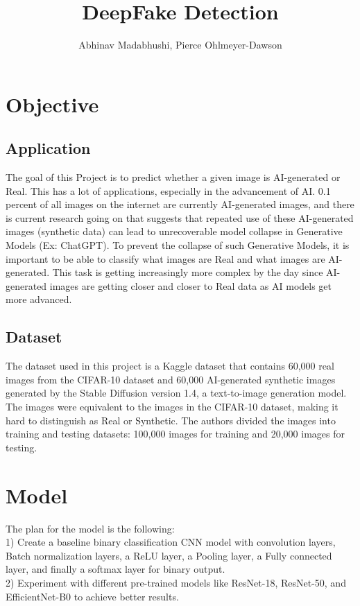 \documentclass[11pt]{article}
\title{DeepFake Detection}
\author{Abhinav Madabhushi, Pierce Ohlmeyer-Dawson}
\date{}
\begin{document}
\maketitle

\section{Objective}

\subsection{Application}
The goal of this Project is to predict whether a given image is AI-generated or Real. This has a lot of applications, especially in the advancement of AI. 0.1 percent of all images on the internet are currently AI-generated images, and there is current research going on that suggests that repeated use of these AI-generated images (synthetic data) can lead to unrecoverable model collapse in Generative Models (Ex: ChatGPT). To prevent the collapse of such Generative Models, it is important to be able to classify what images are Real and what images are AI-generated. This task is getting increasingly more complex by the day since AI-generated images are getting closer and closer to Real data as AI models get more advanced.  

\subsection{Dataset}
The dataset used in this project is a Kaggle dataset that contains 60,000 real images from the CIFAR-10 dataset and 60,000 AI-generated synthetic images generated by the Stable Diffusion version 1.4, a text-to-image generation model. The images were equivalent to the images in the CIFAR-10 dataset, making it hard to distinguish as Real or Synthetic. The authors divided the images into training and testing datasets: 100,000 images for training and 20,000 images for testing. 

\section{Model}
The plan for the model is the following: \\
1) Create a baseline binary classification CNN model with convolution layers, Batch normalization layers, a ReLU layer, a Pooling layer, a Fully connected layer, and finally a softmax layer for binary output. \\
2) Experiment with different pre-trained models like ResNet-18, ResNet-50, and EfficientNet-B0 to achieve better results. \\
\end{document}

